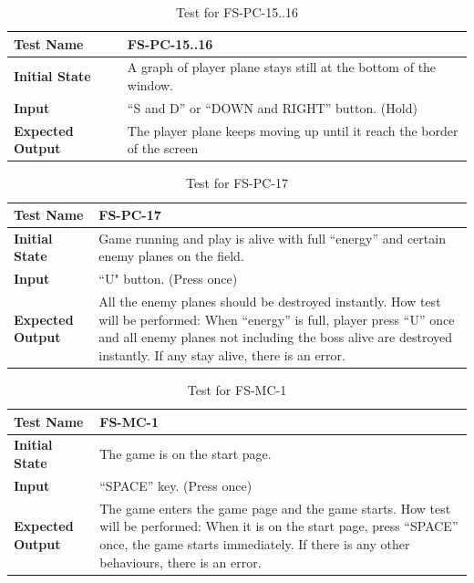 \documentclass[12,english]{article}
\begin{document}
				\begin{table}[!htbp]
			
			\begin{tabularx}{\textwidth}{|l|X|}
				
				\hline
				
				\textbf{Test Name} & FS-PC-15..16
				\\ 
				\hline
				\textbf{Initial State} & A graph of player plane stays still at the bottom of the window. \\ 
				\hline
				\textbf{Input} & “S and D” or “DOWN and RIGHT” button. (Hold)  \\ 
				\hline 
				\textbf{Expected Output} & The player plane keeps moving up until it reach the border of the screen \\ 
				\hline
				
			\end{tabularx}
			\caption{Test for FS-PC-15..16}
			\label{Table}
		\end{table}
				\begin{table}[!htbp]
			
			\begin{tabularx}{\textwidth}{|l|X|}
				
				\hline
				
				\textbf{Test Name} & FS-PC-17
				\\ 
				\hline
				\textbf{Initial State} & Game running and play is alive with full “energy” and certain enemy planes on the field.\\ 
				\hline
				\textbf{Input} & “U" button. (Press once)  \\ 
				\hline 
				\textbf{Expected Output} & All the enemy planes should be destroyed instantly.
How test will be performed: When “energy” is full, player press “U” once and all enemy planes not including the boss alive are destroyed instantly. If any stay alive, there is an error. \\ 
				\hline
				
			\end{tabularx}
			\caption{Test for FS-PC-17}
			\label{Table}
		\end{table}
				\begin{table}[!htbp]
			
			\begin{tabularx}{\textwidth}{|l|X|}
				
				\hline
				
				\textbf{Test Name} & FS-MC-1
				\\ 
				\hline
				\textbf{Initial State} & The game is on the start page. \\ 
				\hline
				\textbf{Input} & “SPACE” key. (Press once)  \\ 
				\hline 
				\textbf{Expected Output} & The game enters the game page and the game starts.
How test will be performed: When it is on the start page, press “SPACE” once, the game starts immediately. If there is any other behaviours, there is an error. \\ 
				\hline
				
			\end{tabularx}
			\caption{Test for FS-MC-1}
			\label{Table}
		\end{table}
\end{document}
